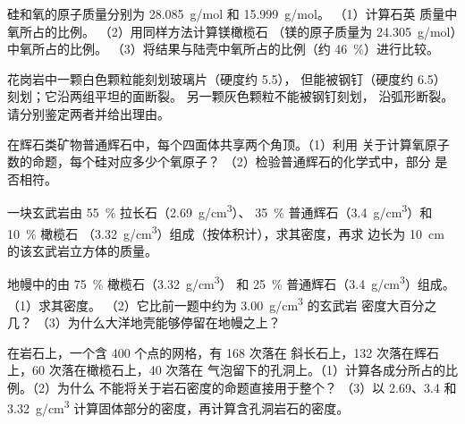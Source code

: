 \begin{exercise}[$\star\star$]\label{exo:g11:minerals:6}
硅和氧的原子质量分别为 \qty{28.085}{g/mol} 和 \qty{15.999}{g/mol}。
（1）计算石英  质量中氧所占的比例。
（2）用同样方法计算镁橄榄石
（镁的原子质量为 \qty{24.305}{g/mol}）中氧所占的比例。
（3）将结果与陆壳中氧所占的比例（约 \qty{46}{\percent}）进行比较。
\end{exercise}

\begin{exercise}[$\star\star$]\label{exo:g11:minerals:7}
花岗岩中一颗白色颗粒能刻划玻璃片（硬度约 5.5），
但能被钢钉（硬度约 6.5）刻划；它沿两组平坦的面断裂。
另一颗灰色颗粒不能被钢钉刻划，
沿弧形断裂。请分别鉴定两者并给出理由。
\end{exercise}

\begin{exercise}[$\star\star$]\label{exo:g11:minerals:8}
在辉石类矿物普通辉石中，每个四面体共享两个角顶。（1）利用
关于计算氧原子数的命题，每个硅对应多少个氧原子？
（2）检验普通辉石的化学式中，部分
 是否相符。
\end{exercise}

\begin{exercise}[$\star\star$]\label{exo:g11:minerals:9}
一块玄武岩由 \qty{55}{\percent} 拉长石（\qty{2.69}{g/cm^3}）、
\qty{35}{\percent} 普通辉石（\qty{3.4}{g/cm^3}）和 \qty{10}{\percent} 橄榄石
（\qty{3.32}{g/cm^3}）组成（按体积计），求其密度，再求
边长为 \qty{10}{cm} 的该玄武岩立方体的质量。
\end{exercise}

\begin{exercise}[$\star\star$]\label{exo:g11:minerals:10}
地幔中的由 \qty{75}{\percent} 橄榄石（\qty{3.32}{g/cm^3}）
和 \qty{25}{\percent} 普通辉石（\qty{3.4}{g/cm^3}）组成。（1）求其密度。
（2）它比前一题中约为 \qty{3.00}{g/cm^3} 的玄武岩
密度大百分之几？
（3）为什么大洋地壳能够停留在地幔之上？
\end{exercise}

\begin{exercise}[$\star\star$]\label{exo:g11:minerals:11}
在岩石上，一个含 400 个点的网格，有 168 次落在
斜长石上，132 次落在辉石上，60 次落在橄榄石上，40 次落在
气泡留下的孔洞上。（1）计算各成分所占的比例。（2）为什么
不能将关于岩石密度的命题直接用于整个？
（3）以 \qty{2.69}{}、\qty{3.4}{}
和 \qty{3.32}{g/cm^3} 计算固体部分的密度，再计算含孔洞岩石的密度。
\end{exercise}

